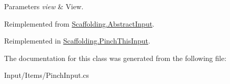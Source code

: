 \begin{DoxyParams}{Parameters}
{\em view} & View.\\
\hline
\end{DoxyParams}


Reimplemented from \hyperlink{class_scaffolding_1_1_abstract_input_a598859c6342920d2b0c985310e6e9476}{Scaffolding.\+Abstract\+Input}.



Reimplemented in \hyperlink{class_scaffolding_1_1_pinch_this_input_a60b5bc5461de1286d8bd142742451dab}{Scaffolding.\+Pinch\+This\+Input}.



The documentation for this class was generated from the following file\+:\begin{DoxyCompactItemize}
\item 
Input/\+Items/Pinch\+Input.\+cs\end{DoxyCompactItemize}
